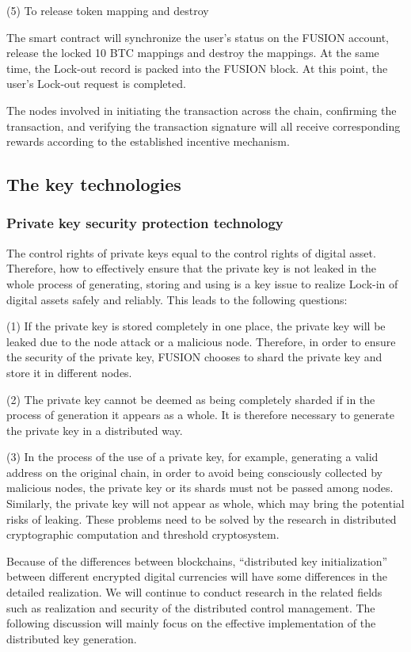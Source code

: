 \documentclass[a4paper,12pt]{article}
\begin{document}
(5) To release token mapping and destroy

The smart contract will synchronize the user's status on the FUSION account, release the locked 10 BTC mappings and destroy the mappings. At the same time, the Lock-out record is packed into the FUSION block. At this point, the user's Lock-out request is completed.

The nodes involved in initiating the transaction across the chain, confirming the transaction, and verifying the transaction signature will all receive corresponding rewards according to the established incentive mechanism.



\subsection{The key technologies}

\subsubsection{Private key security protection technology}

The control rights of private keys equal to the control rights of digital asset. Therefore, how to effectively ensure that the private key is not leaked in the whole process of generating, storing and using is a key issue to realize Lock-in of digital assets safely and reliably. This leads to the following questions:

(1) If the private key is stored completely in one place, the private key will be leaked due to the node attack or a malicious node. Therefore, in order to ensure the security of the private key, FUSION chooses to shard the private key and store it in different nodes.

(2) The private key cannot be deemed as being completely sharded if in the process of generation it appears as a whole.  It is therefore necessary to generate the private key in a distributed way.

(3) In the process of the use of a private key, for example, generating a valid address on the original chain, in order to avoid being consciously collected by malicious nodes, the private key or its shards must not be passed among nodes. Similarly, the private key will not appear as whole, which may bring the potential risks of leaking. These problems need to be solved by the research in distributed cryptographic computation and threshold cryptosystem.

Because of the differences between blockchains, “distributed key initialization” between different encrypted digital currencies will have some differences in the detailed realization. We will continue to conduct research in the related fields such as realization and security of the distributed control management. The following discussion will mainly focus on the effective implementation of the distributed key generation.
\end{document}
